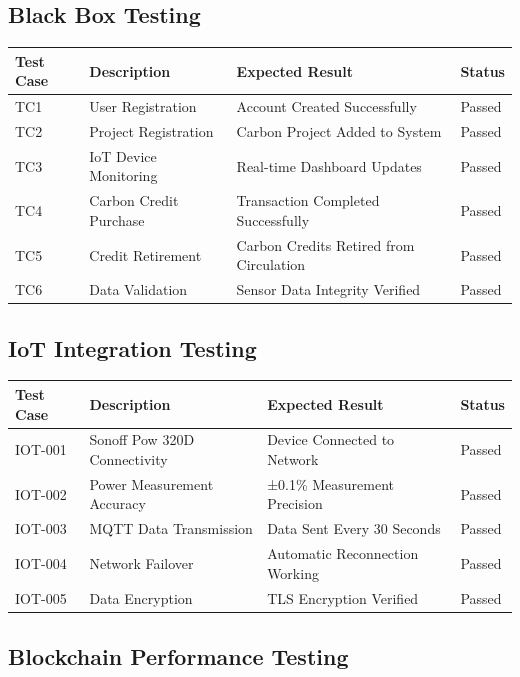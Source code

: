 \documentclass[oneside,a4paper,12pt]{book}
\begin{document}
\begin{appendices}
\subsection{Black Box Testing}

\begin{longtable}{|p{2cm}|p{4cm}|p{3.5cm}|p{2cm}|}
\hline
\textbf{Test Case} & \textbf{Description} & \textbf{Expected Result} & \textbf{Status} \\
\hline
TC1 & User Registration & Account Created Successfully & Passed \\
\hline
TC2 & Project Registration & Carbon Project Added to System & Passed \\
\hline
TC3 & IoT Device Monitoring & Real-time Dashboard Updates & Passed \\
\hline
TC4 & Carbon Credit Purchase & Transaction Completed Successfully & Passed \\
\hline
TC5 & Credit Retirement & Carbon Credits Retired from Circulation & Passed \\
\hline
TC6 & Data Validation & Sensor Data Integrity Verified & Passed \\
\hline
\end{longtable}

\subsection{IoT Integration Testing}

\begin{longtable}{|p{2cm}|p{4cm}|p{3.5cm}|p{2cm}|}
\hline
\textbf{Test Case} & \textbf{Description} & \textbf{Expected Result} & \textbf{Status} \\
\hline
IOT-001 & Sonoff Pow 320D Connectivity & Device Connected to Network & Passed \\
\hline
IOT-002 & Power Measurement Accuracy & ±0.1\% Measurement Precision & Passed \\
\hline
IOT-003 & MQTT Data Transmission & Data Sent Every 30 Seconds & Passed \\
\hline
IOT-004 & Network Failover & Automatic Reconnection Working & Passed \\
\hline
IOT-005 & Data Encryption & TLS Encryption Verified & Passed \\
\hline
\end{longtable}

\subsection{Blockchain Performance Testing}


\end{appendices}
\end{document}
